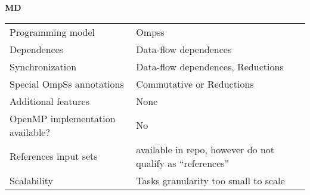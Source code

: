 \section*{}
\label{MD}
\centering
\Huge
\textbf{MD}

\begin{table}[h!]
  \large
  \centering
  \begin{tabular}{|l|l|}
    \hline
    Programming model                & Ompss \\
    Dependences                      & Data-flow dependences \\
    Synchronization                  & Data-flow dependences, Reductions \\
    Special OmpSs annotations        & Commutative or Reductions \\
    Additional features              & None \\
    OpenMP implementation available? & No \\
    References input sets            & available in repo, however do not qualify as ``references'' \\
    Scalability                      & Tasks granularity too small to scale \\
    \hline
  \end{tabular}
\end{table}

\newpage

